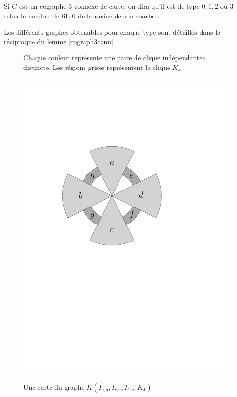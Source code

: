 \documentclass{scrartcl}
\begin{document}
\begin{flushleft}
\begin{def*}[Type]
    Si $G$ est un cographe $3$-connexe de carte, on dira qu'il est de type $0,1,2$ ou $3$ selon le nombre de fils $0$ de la racine de son
    coarbre.
\end{def*}

Les différents graphes obtenables pour chaque type sont détaillés dans la réciproque du lemme \ref{cograph3conn}

\begin{figure}[h]
    \caption{Une carte du graphe $K(I_{p,q}, I_{r,s}, I_{t,u}, K_4)$}\label{IpqIrsItuMap}
    \begin{center}
        Chaque couleur représente une paire de clique indépendantes distincte. Les régions grises représentent la clique $K_4$
        \\~\\
        \includegraphics[page=\ipeFigIpqIrsItuMap, scale = 0.6]{figs}
    \end{center}
\end{figure}


\end{flushleft}
\end{document}
